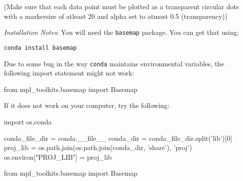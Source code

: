 \documentclass[11pt]{article}
\newenvironment{Shaded}{}{}
\newcommand{\DecValTok}[1]{\textcolor[rgb]{0.25,0.63,0.44}{{#1}}}
\newcommand{\StringTok}[1]{\textcolor[rgb]{0.25,0.44,0.63}{{#1}}}
\newcommand{\NormalTok}[1]{{#1}}
\newcommand{\ImportTok}[1]{{#1}}
\newcommand{\VariableTok}[1]{\textcolor[rgb]{0.10,0.09,0.49}{{#1}}}
\newcommand{\OperatorTok}[1]{\textcolor[rgb]{0.40,0.40,0.40}{{#1}}}
\begin{document}
(Make sure that each data point must be plotted as a transparent
circular dots with a markersize of atleast 20 and alpha set to atmost
0.5 (transparency))

\emph{Installation Notes}: You will need the \texttt{basemap} package.
You can get that using:

\begin{verbatim}
conda install basemap
\end{verbatim}

Due to some bug in the way \texttt{conda} maintains environmental
variables, the following import statement might not work:

\begin{Shaded}
\begin{Highlighting}[]
\ImportTok{from}\NormalTok{ mpl_toolkits.basemap }\ImportTok{import}\NormalTok{ Basemap}
\end{Highlighting}
\end{Shaded}

If it does not work on your computer, try the following:

\begin{Shaded}
\begin{Highlighting}[]
\ImportTok{import}\NormalTok{ os,conda}

\NormalTok{conda_file_dir }\OperatorTok{=}\NormalTok{ conda.}\VariableTok{__file__}
\NormalTok{conda_dir }\OperatorTok{=}\NormalTok{ conda_file_dir.split(}\StringTok{'lib'}\NormalTok{)[}\DecValTok{0}\NormalTok{]}
\NormalTok{proj_lib }\OperatorTok{=}\NormalTok{ os.path.join(os.path.join(conda_dir, }\StringTok{'share'}\NormalTok{), }\StringTok{'proj'}\NormalTok{)}
\NormalTok{os.environ[}\StringTok{"PROJ_LIB"}\NormalTok{] }\OperatorTok{=}\NormalTok{ proj_lib}

\ImportTok{from}\NormalTok{ mpl_toolkits.basemap }\ImportTok{import}\NormalTok{ Basemap}
\end{Highlighting}
\end{Shaded}
\end{document}

